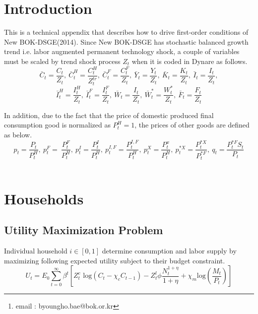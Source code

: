 \documentclass[11pt, a4paper]{article}
\author{\Large{Byoungho Bae}\footnote{email : byoungho.bae@bok.or.kr} \medskip \\{{Macroeconomic Modeling Division, Bank of Korea}}}
\date{\today}%
\begin{document}
\maketitle \newpage

\tableofcontents \newpage

\section{Introduction}
 This is a technical appendix that describes how to drive first-order conditions of New BOK-DSGE(2014).  
 Since New BOK-DSGE has stochastic balanced growth trend i.e. labor augmented permanent technology shock, a couple of variables must be scaled by trend shock process $Z_t$ when it is coded in Dynare as follows.
\[\bar{C}_t =\frac{C_t}{Z_t},~\bar{C}_t^H =\frac{C_t^H}{Z_t^{tr}},~\bar{C}_t^F =\frac{C_t^F}{Z_t}, ~\bar{Y}_t =\frac{Y_t}{Z_t}, ~\bar{K}_t =\frac{K_t}{Z_t},~\bar{I}_t =\frac{I_t}{Z_t},\] 
\[\bar{I}_t^H =\frac{I_t^H}{Z_t},~\bar{I}_t^F =\frac{I_t^F}{Z_t},~\bar{W}_t =\frac{I_t}{Z_t}, ~\bar{W}_t^* =\frac{W_t^*}{Z_t},~\bar{F}_t =\frac{F_t}{Z_t}\]

  In addition, due to the fact that the price of domestic produced final consumption good is normalized as $P_t^H = 1$, the prices of other goods are defined as below.\\
\[ p_t=\frac{P_t}{P_t^H} , ~p_t^F=~\frac{P_t^F}{P_t^H},~p_t^I=\frac{P_t^I}{P_t^H},~p_t^{I,F}=\frac{P_t^{I,F}}{P_t^H},~p_t^{X}=\frac{P_t^{x}}{P_t^H} ,~p_t^{*X}=\frac{P_t^{*X}}{P_t^{*F}} ,~q_t =\frac{P_t^{*F}S_t}{P_t} \]
\\

\section{Households}
 \subsection{Utility Maximization Problem}
 
Individual household $i \in [0, 1]$ determine consumption and labor supply by maximizing following expected utility subject to their budget constraint. \\
 \begin{displaymath}  U_t = E_0 \sum_{t=0}^{\infty} \beta^t \left[ Z_t^c \text{ log} (C_t - \chi_c C_{t-1})- Z_t^l \phi \frac{N_t^{1+\eta}}{1+\eta} + \chi_m \text{log} \left( \frac{M_t}{P_t} \right) \right]  \end{displaymath}
 
\end{document}
